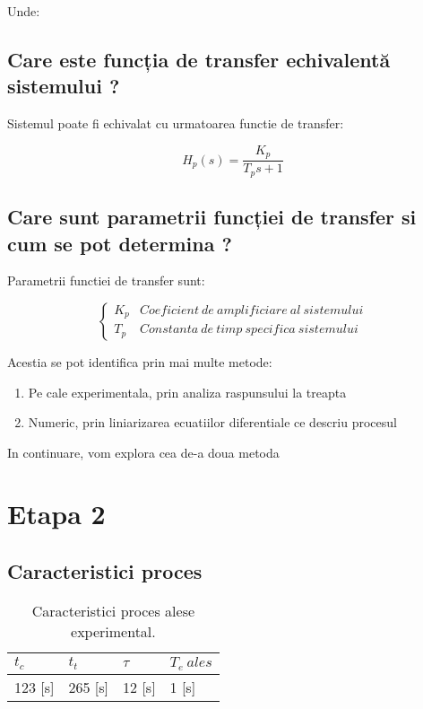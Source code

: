 \documentclass[12pt,english]{article}
\begin{document}
Unde:


\subsection {Care este funcția de transfer echivalentă sistemului ?}
Sistemul poate fi echivalat cu urmatoarea functie de transfer:
\begin{center}
  \begin{equation*}
  H_{p}( s) =\dfrac{K_{p}}{T_{p} s+1}
  \end{equation*}
\end{center}

\subsection {Care sunt parametrii funcției de transfer si cum se pot determina ?}
Parametrii functiei de transfer sunt:
\begin{center}
  \begin{equation*}
  \begin{cases}
  K_{p} & Coeficient\ de\ amplificiare\ al\ sistemului\\
  T_{p} & Constanta\ de\ timp\ specifica\ sistemului
  \end{cases}
  \end{equation*}
\end{center}

Acestia se pot identifica prin mai multe metode:
\begin{enumerate}
  \item Pe cale experimentala, prin analiza raspunsului la treapta
  \item Numeric, prin liniarizarea ecuatiilor diferentiale ce descriu procesul
\end{enumerate}

In continuare, vom explora cea de-a doua metoda

\section {Etapa 2}

\subsection {Caracteristici proces }
\begin{table}[H]
  \centering
  \begin{tabular}{|l|l|l|l|}
    \hline
    $t_c$ & $t_t$ & $\tau$ & $T_e\ ales$ \\
    \hline
    123 [s] & 265 [s] & 12 [s] & 1 [s] \\
    \hline
  \end{tabular}
  \caption{Caracteristici proces alese experimental.}
\end{table}
\end{document}
